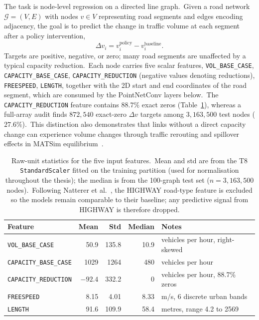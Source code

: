 The task is node-level regression on a directed line graph.\ Given a road network $\mathcal{G} = (V, E)$ with nodes $v \in V$ representing road segments and edges encoding adjacency, the goal is to predict the change in traffic volume at each segment after a policy intervention,
\begin{equation}\label{eq:target}
 \Delta v_i = v_i^\text{policy} - v_i^\text{baseline}.
\end{equation}
Targets are positive, negative, or zero; many road segments are unaffected by a typical capacity reduction.\ Each node carries five scalar features, \texttt{VOL\_BASE\_CASE}, \texttt{CAPACITY\_BASE\_CASE}, \texttt{CAPACITY\_REDUCTION} (negative values denoting reductions), \texttt{FREESPEED}, \texttt{LENGTH}, together with the 2D start and end coordinates of the road segment, which are consumed by the PointNetConv layers below.\ The \texttt{CAPACITY\_REDUCTION} feature contains $88.7\%$ exact zeros (Table~\ref{tab:feature_stats}), whereas a full-array audit finds $872{,}540$ exact-zero $\Delta v$ targets among $3{,}163{,}500$ test nodes ($27.6\%$).\ This distinction also demonstrates that links without a direct capacity change can experience volume changes through traffic rerouting and spillover effects in MATSim equilibrium~\cite{natterer2025ml}.

\begin{table}[htbp]
\centering
\caption[Raw-unit statistics for the five input features]{Raw-unit statistics for the five input features.\ Mean and std are from the T8 \texttt{StandardScaler} fitted on the training partition (used for normalisation throughout the thesis); the median is from the 100-graph test set ($n = 3{,}163{,}500$ nodes).\ Following Natterer et al.~\cite{natterer2025ml}, the HIGHWAY road-type feature is excluded so the models remain comparable to their baseline; any predictive signal from HIGHWAY is therefore dropped.}
\label{tab:feature_stats}
\begin{tabular}{lrrrl}
\toprule
Feature & Mean & Std & Median & Notes \\
\midrule
\texttt{VOL\_BASE\_CASE}      & 50.9   & 135.8  & 10.9 & vehicles per hour, right-skewed \\
\texttt{CAPACITY\_BASE\_CASE} & 1029   & 1264   & 480  & vehicles per hour \\
\texttt{CAPACITY\_REDUCTION}  & $-92.4$ & 332.2 & 0    & vehicles per hour, 88.7\% zeros \\
\texttt{FREESPEED}            & 8.15   & 4.01   & 8.33 & m/s, 6 discrete urban bands \\
\texttt{LENGTH}               & 91.6   & 109.9  & 58.4 & metres, range 4.2 to 2569 \\
\bottomrule
\end{tabular}
\end{table}

